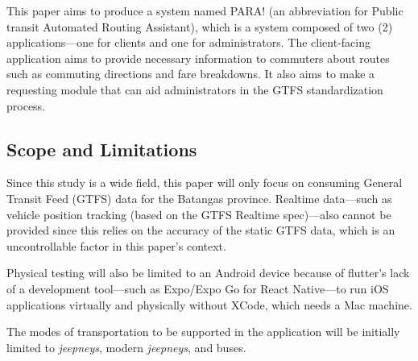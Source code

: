 \documentclass[journal]{./IEEE/IEEEtran}
\begin{document}
This paper aims to produce a system named PARA\@! (an abbreviation for Public transit Automated Routing Assistant), which is a system composed of two (2) applications---one for clients and one for administrators.
The client-facing application aims to provide necessary information to commuters about routes such as commuting directions and fare breakdowns.
It also aims to make a requesting module that can aid administrators in the GTFS standardization process.

\subsection{Scope and Limitations}
Since this study is a wide field, this paper will only focus on consuming General Transit Feed (GTFS) data for the Batangas province. Realtime data---such as vehicle position tracking (based on the GTFS Realtime spec)---also cannot be provided since this relies on the accuracy of the static GTFS data, which is an uncontrollable factor in this paper's context.

Physical testing will also be limited to an Android device because of flutter's lack of a development tool---such as Expo/Expo Go for React Native---to run iOS applications virtually and physically without XCode, which needs a Mac machine.

The modes of transportation to be supported in the application will be initially limited to \textit{jeepneys}, modern \textit{jeepneys}, and buses.  
\end{document}
